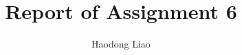 \documentclass{article}
\title{Report of Assignment 6}
\author{Haodong Liao}
\begin{document}
\maketitle{}











\end{document}
